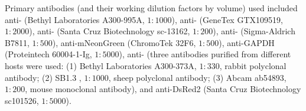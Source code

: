 Primary antibodies (and their working dilution factors by volume) used included anti- (Bethyl Laboratories A300-995A, $1 : 1000$), anti- (GeneTex GTX109519, $1 : 2000$), anti- (Santa Cruz Biotechnology sc-13162, $1 : 200$), anti- (Sigma-Aldrich B7811, $1 : 500$), anti-mNeonGreen (ChromoTek 32F6, $1 : 500$), anti-GAPDH (Proteintech 60004-1-Ig, $1 : 5000$), anti- (three antibodies purified from different hosts were used: (1) Bethyl Laboratories A300-373A, $1 : 330$, rabbit polyclonal antibody; (2) SB1.3 \cite{SheepAntiBUB1}, $1 : 1000$, sheep polyclonal antibody; (3) Abcam ab54893, $1 : 200$, mouse monoclonal antibody), and anti-DsRed2 (Santa Cruz Biotechnology sc101526, $1 : 5000$).
